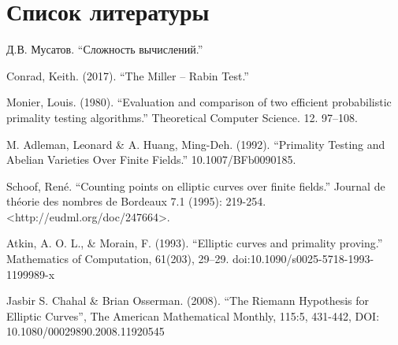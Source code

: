 \documentclass[12pt]{article}
\theoremstyle{definition}
\numberwithin{Def}{section}
\numberwithin{Th}{section}
\numberwithin{St}{section}
\numberwithin{Cor}{section}
\begin{document}
\section{Список литературы}

\begin{enumerate}[{[}1{]}]
	\item Д.В. Мусатов. “Сложность вычислений.”
	\item \label{Conrad} Conrad, Keith. (2017). “The Miller – Rabin Test.”
	\item \label{Monier} Monier, Louis. (1980). “Evaluation and comparison of two 
	efficient probabilistic primality testing algorithms.”
	Theoretical Computer Science. 12. 97–108.
	\item \label{Adleman} M. Adleman, Leonard \& A. Huang, Ming-Deh. (1992).
	“Primality Testing and Abelian Varieties Over Finite Fields.”
	10.1007/BFb0090185.
	\item \label{Schoof} Schoof, René. “Counting points on elliptic curves over 
	finite fields.” Journal de théorie des nombres de Bordeaux 7.1 (1995): 
	219-254. <http://eudml.org/doc/247664>.
	\item Atkin, A. O. L., \& Morain, F. (1993). “Elliptic curves and primality 
	proving.” Mathematics of Computation, 61(203), 29–29.
	doi:10.1090/s0025-5718-1993-1199989-x
	\item \label{Riemann} Jasbir S. Chahal \& Brian Osserman. (2008).
	“The Riemann Hypothesis for Elliptic Curves”,
	The American Mathematical Monthly, 115:5, 
	431-442, DOI: 10.1080/00029890.2008.11920545
\end{enumerate}
\end{document}
